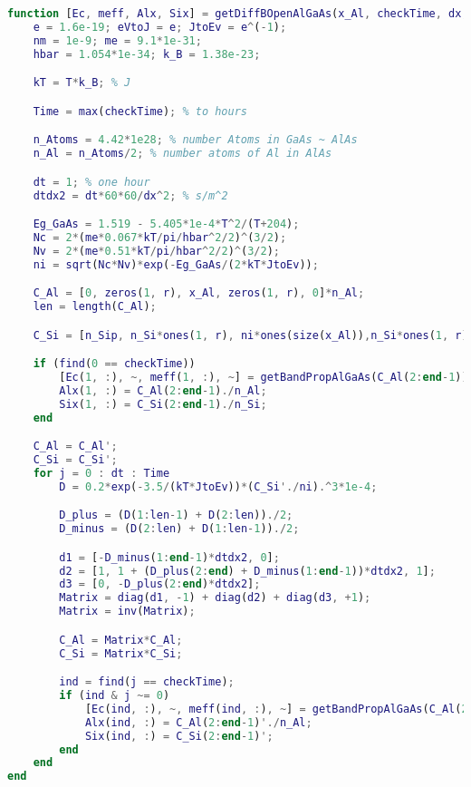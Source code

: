 \begin{lstlisting}[style=realcode,language=Matlab,caption={Функция расчета диффузии методом BTCS с непостоянным коэффициентом диффузии},label={lst:DSiDiff}]
function [Ec, meff, Alx, Six] = getDiffBOpenAlGaAs(x_Al, checkTime, dx, T, n_Sip, n_Si, r)
	e = 1.6e-19; eVtoJ = e; JtoEv = e^(-1);
	nm = 1e-9; me = 9.1*1e-31;
	hbar = 1.054*1e-34; k_B = 1.38e-23;

	kT = T*k_B; % J

	Time = max(checkTime); % to hours

	n_Atoms = 4.42*1e28; % number Atoms in GaAs ~ AlAs
	n_Al = n_Atoms/2; % number atoms of Al in AlAs

	dt = 1; % one hour
	dtdx2 = dt*60*60/dx^2; % s/m^2

	Eg_GaAs = 1.519 - 5.405*1e-4*T^2/(T+204);
	Nc = 2*(me*0.067*kT/pi/hbar^2/2)^(3/2);
	Nv = 2*(me*0.51*kT/pi/hbar^2/2)^(3/2);
	ni = sqrt(Nc*Nv)*exp(-Eg_GaAs/(2*kT*JtoEv));

	C_Al = [0, zeros(1, r), x_Al, zeros(1, r), 0]*n_Al;
	len = length(C_Al);

	C_Si = [n_Sip, n_Si*ones(1, r), ni*ones(size(x_Al)),n_Si*ones(1, r), n_Sip];

	if (find(0 == checkTime))
		[Ec(1, :), ~, meff(1, :), ~] = getBandPropAlGaAs(C_Al(2:end-1));
		Alx(1, :) = C_Al(2:end-1)./n_Al;		
		Six(1, :) = C_Si(2:end-1)./n_Si;		
	end

	C_Al = C_Al';
	C_Si = C_Si';
	for j = 0 : dt : Time
		D = 0.2*exp(-3.5/(kT*JtoEv))*(C_Si'./ni).^3*1e-4;

		D_plus = (D(1:len-1) + D(2:len))./2;
		D_minus = (D(2:len) + D(1:len-1))./2;

		d1 = [-D_minus(1:end-1)*dtdx2, 0];
		d2 = [1, 1 + (D_plus(2:end) + D_minus(1:end-1))*dtdx2, 1];
		d3 = [0, -D_plus(2:end)*dtdx2];
		Matrix = diag(d1, -1) + diag(d2) + diag(d3, +1);
		Matrix = inv(Matrix);

		C_Al = Matrix*C_Al;
		C_Si = Matrix*C_Si;

		ind = find(j == checkTime); 
		if (ind & j ~= 0)
			[Ec(ind, :), ~, meff(ind, :), ~] = getBandPropAlGaAs(C_Al(2:end-1)');
			Alx(ind, :) = C_Al(2:end-1)'./n_Al;
			Six(ind, :) = C_Si(2:end-1)';
		end
	end
end
\end{lstlisting}